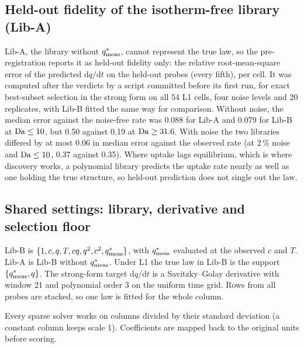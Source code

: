 \subsection*{Held-out fidelity of the isotherm-free library (Lib-A)}
Lib-A, the library without $q^{*}_{\mathrm{meas}}$, cannot represent the true law, so the pre-registration reports
it as held-out fidelity only: the relative root-mean-square error of the predicted
$\mathrm{d}q/\mathrm{d}t$ on the held-out probes (every fifth), per cell. It was computed after the
verdicts by a script committed before its first run, for exact best-subset selection in the strong
form on all 54 L1 cells, four noise levels and 20 replicates, with Lib-B fitted the same way for
comparison. Without noise, the median error against the noise-free rate was 0.088 for Lib-A and
0.079 for Lib-B at $\mathrm{Da} \le 10$, but 0.50 against 0.19 at $\mathrm{Da} \ge 31.6$. With noise the two
libraries differed by at most 0.06 in median error against the observed rate (at 2\,\% noise and
$\mathrm{Da} \le 10$, 0.37 against 0.35). Where uptake lags equilibrium, which is where discovery works, a
polynomial library predicts the uptake rate nearly as well as one holding the true structure, so
held-out prediction does not single out the law.

\subsection*{Shared settings: library, derivative and selection floor}
Lib-B is $\{1, c, q, T, cq, q^2, c^2, q^{*}_{\mathrm{meas}}\}$, with $q^{*}_{\mathrm{meas}}$ evaluated at the observed $c$ and
$T$. Lib-A is Lib-B without $q^{*}_{\mathrm{meas}}$. Under L1 the true law in Lib-B is the support
$\{q^{*}_{\mathrm{meas}}, q\}$. The strong-form target $\mathrm{d}q/\mathrm{d}t$ is a Savitzky--Golay
derivative with window 21 and polynomial order 3 on the uniform time grid. Rows from all
probes are stacked, so one law is fitted for the whole column.

Every sparse solver works on columns divided by their standard deviation (a constant column
keeps scale 1). Coefficients are mapped back to the original units before scoring.

